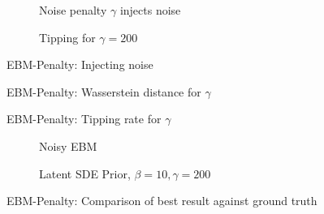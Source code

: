 \documentclass[twoside,11pt]{article}
\begin{document}
\begin{figure}
    \begin{subfigure}{.5\textwidth}
        \centering
        
        \caption{Noise penalty \(\gamma\) injects noise}
        \label{fig:penalty_diffusion_size}
    \end{subfigure}
    \begin{subfigure}{.5\textwidth}
        \centering
        
        \caption{Tipping for \(\gamma=200\)}
        \label{fig:tipping_gamma_200}
    \end{subfigure}
    \caption{EBM-Penalty: Injecting noise}
\end{figure}


\begin{figure}
    \begin{center}
    
    \end{center}
    \caption{EBM-Penalty: Wasserstein distance for \(\gamma\)}
\label{fig:gamma_wasserstein}
\end{figure}

\begin{figure}
    \begin{center}
    
    \end{center}
    \caption{EBM-Penalty: Tipping rate for \(\gamma\)}
    \label{fig:gamma_tipping_rate}
\end{figure}

\begin{figure}
    \begin{subfigure}{\textwidth}
        \begin{center}
            
        \end{center}
        \caption{Noisy EBM}
    \end{subfigure}
    \begin{subfigure}{\textwidth}
        \begin{center}
            
        \end{center}
        \caption{Latent SDE Prior, \(\beta=10, \gamma=200\)}
    \end{subfigure}
    \caption{EBM-Penalty: Comparison of best result against ground truth}
\end{figure}
\end{document}
